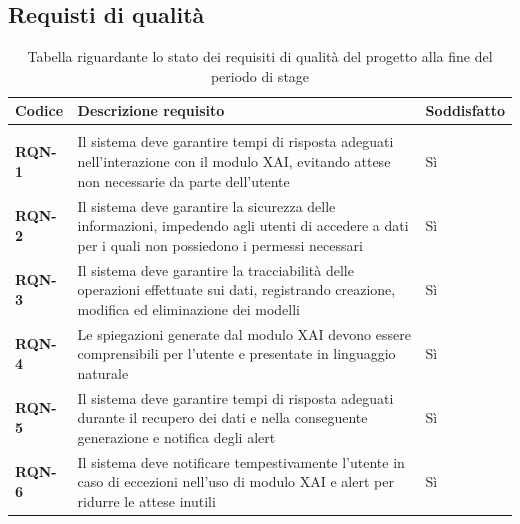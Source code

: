 \newpage

\subsection{Requisti di qualità}
\keepXColumns
{}
    \begin{longtable}{|l|p{}|l|}
        \hline
        \rowcolor{gold}
        \textbf{Codice} & \textbf{Descrizione requisito} & \textbf{Soddisfatto} \\
        \hline
        \endhead

        \hline
        \rowcolor{white}
        \caption{Tabella riguardante lo stato dei requisiti di qualità del progetto alla fine del periodo di stage} \label{tab:requisiti_stato_qualitativi} \\
        \endlastfoot 

        \textbf{RQN-1} & Il sistema deve garantire tempi di risposta adeguati nell'interazione con il modulo XAI, evitando attese non necessarie da parte dell'utente & Sì \\
        \hline
        \textbf{RQN-2} & Il sistema deve garantire la sicurezza delle informazioni, impedendo agli utenti di accedere a dati per i quali non possiedono i permessi necessari & Sì \\
        \hline
        \textbf{RQN-3} & Il sistema deve garantire la tracciabilità delle operazioni effettuate sui dati, registrando creazione, modifica ed eliminazione dei modelli & Sì \\
        \hline
        \textbf{RQN-4} & Le spiegazioni generate dal modulo XAI devono essere comprensibili per l'utente e presentate in linguaggio naturale & Sì \\
        \hline
        \textbf{RQN-5} & Il sistema deve garantire tempi di risposta adeguati durante il recupero dei dati e nella conseguente generazione e notifica degli alert & Sì \\
        \hline
        \textbf{RQN-6} & Il sistema deve notificare tempestivamente l'utente in caso di eccezioni nell'uso di modulo XAI e alert per ridurre le attese inutili & Sì \\
    \end{longtable}

\newpage
